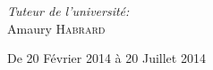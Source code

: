 \begin{titlepage}
\begin{center}
\begin{minipage}[t]{0.6\textwidth}
\begin{flushright}
    
    \emph{Tuteur de l'université:} \\
        Amaury \textsc{Habrard} \\
  \end{flushright}
\end{minipage}

\vfill
\vfill
{\large De 20 Février 2014 à 20 Juillet 2014}

\end{center}

\end{titlepage}
